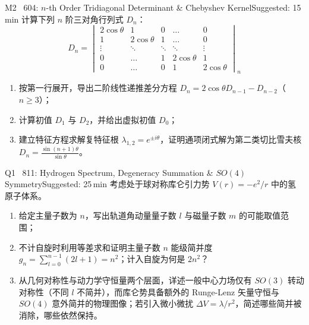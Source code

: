 \documentclass[a4paper,11pt]{article}
\begin{document}
\begin{problem}{M2 \textbar\ 604: $n$-th Order Tridiagonal Determinant \& Chebyshev Kernel}{Suggested: 15\,min}
计算下列 $n$ 阶三对角行列式 $D_n$：
\[
  D_n = \begin{vmatrix}
    2\cos\theta & 1 & 0 & \dots & 0 \\
    1 & 2\cos\theta & 1 & \dots & 0 \\
    \vdots & \ddots & \ddots & \ddots & \vdots \\
    0 & \dots & 1 & 2\cos\theta & 1 \\
    0 & \dots & 0 & 1 & 2\cos\theta
  \end{vmatrix}_n
\]
\begin{enumerate}[leftmargin=1.5em,itemsep=0.5pt,topsep=1pt]
  \item 按第一行展开，导出二阶线性递推差分方程 $D_n = 2\cos\theta D_{n-1} - D_{n-2}$（$n \ge 3$）；
  \item 计算初值 $D_1$ 与 $D_2$，并给出虚拟初值 $D_0$；
  \item 建立特征方程求解复特征根 $\lambda_{1,2} = e^{\pm i\theta}$，证明通项闭式解为第二类切比雪夫核 $D_n = \frac{\sin(n+1)\theta}{\sin\theta}$。
\end{enumerate}
\end{problem}

\vspace{2pt}

\begin{problem}{Q1 \textbar\ 811: Hydrogen Spectrum, Degeneracy Summation \& $SO(4)$ Symmetry}{Suggested: 25\,min}
考虑处于球对称库仑引力势 $V(r) = -e^2/r$ 中的氢原子体系。
\begin{enumerate}[leftmargin=1.5em,itemsep=0.5pt,topsep=1pt]
  \item 给定主量子数为 $n$，写出轨道角动量量子数 $l$ 与磁量子数 $m$ 的可能取值范围；
  \item 不计自旋时利用等差求和证明主量子数 $n$ 能级简并度 $g_n = \sum_{l=0}^{n-1} (2l+1) = n^2$；计入自旋为何是 $2n^2$？
  \item 从几何对称性与动力学守恒量两个层面，详述一般中心力场仅有 $SO(3)$ 转动对称性（不同 $l$ 不简并），而库仑势具备额外的 Runge-Lenz 矢量守恒与 $SO(4)$ 意外简并的物理图像；若引入微小微扰 $\Delta V = \lambda/r^2$，简述哪些简并被消除，哪些依然保持。
\end{enumerate}
\end{problem}

\vspace{2pt}
\end{document}
